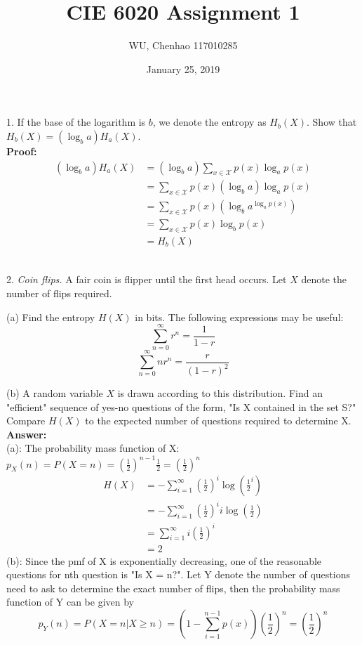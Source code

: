 \documentclass[12pt]{article}
\author{WU, Chenhao  117010285}
\title{CIE 6020 Assignment 1}
\date{January 25, 2019}
\begin{document}
	\maketitle
	\par
	1. If the base of the logarithm is $b$, we denote the entropy as $H_b(X)$. Show that $H_b(X) = (\log_ba)H_a(X)$. \\
	\textbf{Proof:} 
	\begin{align*}
		(\log_ba)H_a(X) &= (\log_ba)\sum_{x\in\mathcal{X}} p(x)\log_a p(x) \\
		&= \sum_{x\in\mathcal{X}}p(x)(\log_ba)\log_ap(x) \\
		&= \sum_{x\in\mathcal{X}}p(x)(\log_ba^{\log_ap(x)}) \\
		&= \sum_{x\in\mathcal{X}}p(x)\log_bp(x) \\
		&= H_b(X)
	\end{align*}\\
	\par 
	2. \textit{Coin flips.} A fair coin is flipper until the first head occurs. Let $X$ denote the number of flips required. \par 
	(a) Find the entropy $H(X)$ in bits. The following expressions may be useful:$$ \sum_{n=0}^{\infty}r^n = \frac{1}{1-r}$$ $$\sum_{n=0}^{\infty}nr^n = \frac{r}{(1-r)^2}$$ \par 
	(b) A random variable $X$ is drawn according to this distribution. Find an "efficient" sequence of yes-no questions of the form, "Is X contained in the set S?" Compare $H(X)$ to the expected number of questions required to determine X. \\
	\textbf{Answer:} \\
	(a): The probability mass function of X: $p_X(n) = P(X=n) = (\frac{1}{2})^{n-1}\frac{1}{2} = (\frac{1}{2})^n $
	\begin{align*}
		H(X) &= -\sum_{i=1}^{\infty} (\frac{1}{2})^i \log(\frac{1}{2}^i) \\
		     &= -\sum_{i=1}^{\infty} (\frac{1}{2})^ii\log(\frac{1}{2}) \\
		     &= \sum_{i=1}^{\infty} i(\frac{1}{2})^i \\
		     &= 2
	\end{align*}
	(b): Since the pmf of X is exponentially decreasing, one of the reasonable questions for nth question is "Is X = n?". Let Y denote the number of questions need to ask to determine the exact number of flips, then the probability mass function of Y can be given by $$p_Y(n) = P(X = n|X \geq n) = (1-\sum_{i = 1}^{n-1}p(x))(\frac{1}{2})^n = (\frac{1}{2})^n$$
\end{document}
